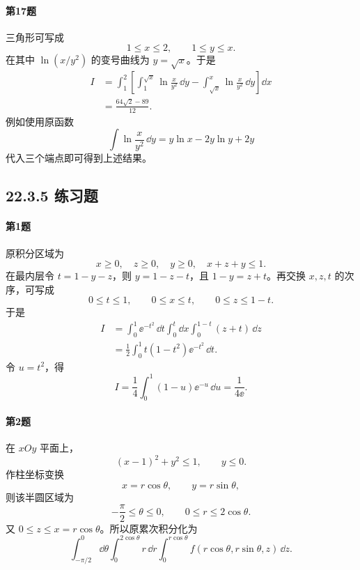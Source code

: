 \paragraph{第17题}
\begin{xsolution}
三角形可写成
\[
 1\le x\le2,
 \qquad1\le y\le x.
\]
在其中 $\ln(x/y^2)$ 的变号曲线为 $y=\sqrt x$。于是
\begin{align*}
 I&=\int_1^2\left[
 \int_1^{\sqrt x}\ln\frac{x}{y^2}\,\dd y
 -\int_{\sqrt x}^{x}\ln\frac{x}{y^2}\,\dd y
 \right]\dd x\\
 &=\boxed{\frac{64\sqrt2-89}{12}}.
\end{align*}
例如使用原函数
\[
 \int\ln\frac{x}{y^2}\,\dd y
 =y\ln x-2y\ln y+2y
\]
代入三个端点即可得到上述结果。
\end{xsolution}

\subsection*{22.3.5 练习题}

\paragraph{第1题}
\begin{xsolution}
原积分区域为
\[
 x\ge0,\quad z\ge0,\quad y\ge0,\quad x+z+y\le1.
\]
在最内层令 $t=1-y-z$，则 $y=1-z-t$，且 $1-y=z+t$。再交换 $x,z,t$ 的次序，可写成
\[
 0\le t\le1,
 \qquad0\le x\le t,
 \qquad0\le z\le1-t.
\]
于是
\begin{align*}
 I&=\int_0^1\ee^{-t^2}\,\dd t\int_0^t\dd x\int_0^{1-t}(z+t)\,\dd z\\
 &=\frac12\int_0^1t(1-t^2)\ee^{-t^2}\,\dd t.
\end{align*}
令 $u=t^2$，得
\[
 I=\frac14\int_0^1(1-u)\ee^{-u}\,\dd u
 =\boxed{\frac1{4\ee}}.
\]
\end{xsolution}

\paragraph{第2题}
\begin{xsolution}
在 $xOy$ 平面上，
\[
 (x-1)^2+y^2\le1,
 \qquad y\le0.
\]
作柱坐标变换
\[
 x=r\cos\theta,
 \qquad y=r\sin\theta,
\]
则该半圆区域为
\[
 -\frac\pi2\le\theta\le0,
 \qquad0\le r\le2\cos\theta.
\]
又 $0\le z\le x=r\cos\theta$。所以原累次积分化为
\[
 \boxed{
 \int_{-\pi/2}^{0}\dd\theta
 \int_0^{2\cos\theta}r\,\dd r
 \int_0^{r\cos\theta}
 f(r\cos\theta,r\sin\theta,z)\,\dd z }.
\]
\end{xsolution}

